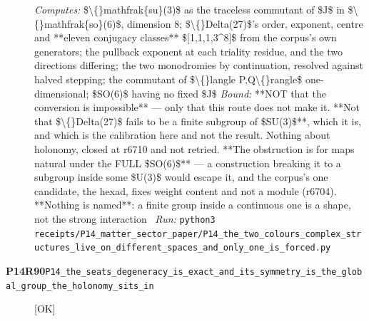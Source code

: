 \begin{description}
\emph{Computes:} \$\textbackslash\{\}mathfrak\{su\}(3)\$ as the traceless commutant of \$J\$ in \$\textbackslash\{\}mathfrak\{so\}(6)\$, dimension 8; \$\textbackslash\{\}Delta(27)\$'s order, exponent, centre and **eleven conjugacy classes** \$[1,1,1,3\textasciicircum{}8]\$ from the corpus's own generators; the pullback exponent at each triality residue, and the two directions differing; the two monodromies by continuation, resolved against halved stepping; the commutant of \$\textbackslash\{\}langle P,Q\textbackslash\{\}rangle\$ one-dimensional; \$SO(6)\$ having no fixed \$J\$
 \emph{Bound:}  **NOT that the conversion is impossible** --- only that this route does not make it. **Not that \$\textbackslash\{\}Delta(27)\$ fails to be a finite subgroup of \$SU(3)\$**, which it is, and which is the calibration here and not the result. Nothing about holonomy, closed at r6710 and not retried. **The obstruction is for maps natural under the FULL \$SO(6)\$** --- a construction breaking it to a subgroup inside some \$U(3)\$ would escape it, and the corpus's one candidate, the hexad, fixes weight content and not a module (r6704). **Nothing is named**: a finite group inside a continuous one is a shape, not the strong interaction
\ \emph{Run:} \texttt{python3 receipts/P14\_matter\_sector\_paper/P14\_the\_two\_colours\_complex\_structures\_live\_on\_different\_spaces\_and\_only\_one\_is\_forced.py}
\item[\rcptlabel{P14_the_seats_degeneracy_is_exact_and_its_symmetry_is_the_global_group_the_holonomy_sits_in}{P14R90}\textbf{P14R90}\quad\texttt{P14\_the\_seats\_degeneracy\_is\_exact\_and\_its\_symmetry\_is\_the\_global\_group\_the\_holonomy\_sits\_in}]\hfill\textsf{[OK]}\\

\end{description}
